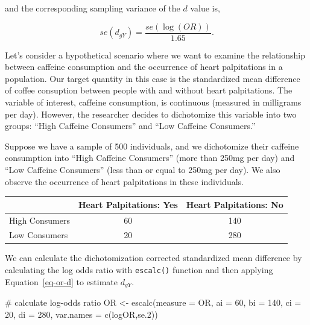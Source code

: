 \documentclass[
  letterpaper,
  DIV=11,
  numbers=noendperiod]{scrreprt}
\newenvironment{Shaded}{}{}
\newcommand{\AttributeTok}[1]{\textcolor[rgb]{0.00,0.34,0.68}{#1}}
\newcommand{\CommentTok}[1]{\textcolor[rgb]{0.54,0.53,0.53}{#1}}
\newcommand{\DecValTok}[1]{\textcolor[rgb]{0.69,0.50,0.00}{#1}}
\newcommand{\FunctionTok}[1]{\textcolor[rgb]{0.39,0.29,0.61}{#1}}
\newcommand{\NormalTok}[1]{\textcolor[rgb]{0.12,0.11,0.11}{#1}}
\newcommand{\OtherTok}[1]{\textcolor[rgb]{0.00,0.43,0.16}{#1}}
\newcommand{\StringTok}[1]{\textcolor[rgb]{0.75,0.01,0.01}{#1}}
\begin{document}
and the corresponding sampling variance of the \(d\) value is,

\[
se(d_{gY}) = \frac{se(\log(OR))}{1.65}.
\]

\begin{tcolorbox}[enhanced jigsaw, opacityback=0, coltitle=black, toprule=.15mm, colframe=quarto-callout-note-color-frame, bottomtitle=1mm, rightrule=.15mm, colbacktitle=quarto-callout-note-color!10!white, left=2mm, bottomrule=.15mm, breakable, title={Applied Example in R}, colback=white, opacitybacktitle=0.6, titlerule=0mm, arc=.35mm, leftrule=.75mm, toptitle=1mm]

Let's consider a hypothetical scenario where we want to examine the
relationship between caffeine consumption and the occurrence of heart
palpitations in a population. Our target quantity in this case is the
standardized mean difference of coffee consuption between people with
and without heart palpitations. The variable of interest, caffeine
consumption, is continuous (measured in milligrams per day). However,
the researcher decides to dichotomize this variable into two groups:
``High Caffeine Consumers'' and ``Low Caffeine Consumers.''

Suppose we have a sample of 500 individuals, and we dichotomize their
caffeine consumption into ``High Caffeine Consumers'' (more than 250mg
per day) and ``Low Caffeine Consumers'' (less than or equal to 250mg per
day). We also observe the occurrence of heart palpitations in these
individuals.

\begin{longtable}[]{@{}lcc@{}}
\toprule\noalign{}
& Heart Palpitations: Yes & Heart Palpitations: No \\
\midrule\noalign{}
\endhead
\bottomrule\noalign{}
\endlastfoot
High Consumers & 60 & 140 \\
Low Consumers & 20 & 280 \\
\end{longtable}

We can calculate the dichotomization corrected standardized mean
difference by calculating the log odds ratio with \texttt{escalc()}
function and then applying Equation~\ref{eq-or-d} to estimate
\(d_{gY}\).

\begin{Shaded}
\begin{Highlighting}[]
\CommentTok{\# calculate log{-}odds ratio}
\NormalTok{OR }\OtherTok{\textless{}{-}} \FunctionTok{escalc}\NormalTok{(}\AttributeTok{measure =} \StringTok{\textquotesingle{}OR\textquotesingle{}}\NormalTok{,}
             \AttributeTok{ai =} \DecValTok{60}\NormalTok{,}
             \AttributeTok{bi =} \DecValTok{140}\NormalTok{,}
             \AttributeTok{ci =} \DecValTok{20}\NormalTok{,}
             \AttributeTok{di =} \DecValTok{280}\NormalTok{,}
             \AttributeTok{var.names =} \FunctionTok{c}\NormalTok{(}\StringTok{\textquotesingle{}logOR\textquotesingle{}}\NormalTok{,}\StringTok{\textquotesingle{}se.2\textquotesingle{}}\NormalTok{))  }


\end{Highlighting}
\end{Shaded}
\end{tcolorbox}
\end{document}
